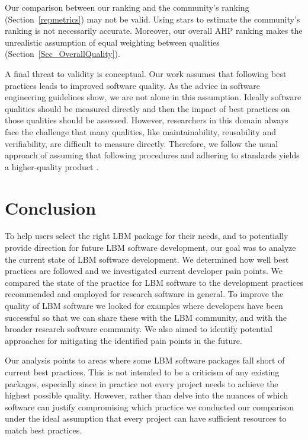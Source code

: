 \documentclass[final, 3p, times, authoryear]{elsarticle}
\begin{document}
Our comparison between our ranking and the community's ranking
(Section~\ref{repmetrics}) may not be valid.  Using stars to estimate the
community's ranking is not necessarily accurate.  Moreover, our overall AHP
ranking makes the unrealistic assumption of equal weighting between qualities
(Section~\ref{Sec_OverallQuality}).

A final threat to validity is conceptual.  Our work assumes that following best
practices leads to improved software quality.  As the advice in software
engineering guidelines show, we are not alone in this assumption.  Ideally
software qualities should be measured directly and then the impact of best
practices on those qualities should be assessed.  However, researchers in this
domain always face the challenge that many qualities, like maintainability,
reusability and verifiability, are difficult to measure directly.  Therefore, we
follow the usual approach of assuming that following procedures and adhering to
standards yields a higher-quality product \citep[p.\ 112]{VanVliet2000}.

\section{Conclusion} \label{conclusion}

To help users select the right LBM package for their needs, and to potentially
provide direction for future LBM software development, our goal was to analyze
the current state of LBM software development.  We determined how well best
practices are followed and we investigated current developer pain points.  We
compared the state of the practice for LBM software to the development practices
recommended and employed for research software in general. To improve the
quality of LBM software we looked for examples where developers have been
successful so that we can share these with the LBM community, and with the
broader research software community.  We also aimed to identify potential
approaches for mitigating the identified pain points in the future.

Our analysis points to areas where some LBM software packages fall short of
current best practices.  This is not intended to be a criticism of any existing
packages, especially since in practice not every project needs to achieve the
highest possible quality.  However, rather than delve into the nuances of which
software can justify compromising which practice we conducted our comparison
under the ideal assumption that every project can have sufficient resources to
match best practices.
\end{document}
